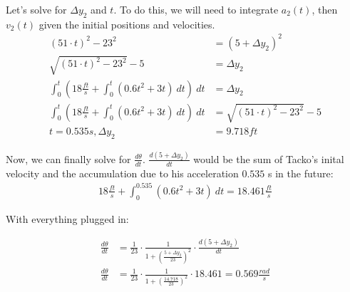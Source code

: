 \documentclass[xcolor={usenames, dvipsnames}]{beamer}
\begin{document}
\begin{frame}

    \begin{figure}[t]
    \end{figure}

    Let's solve for $\Delta y_2$ and $t$. To do this, we will need to integrate $a_2(t)$, 
    then $v_2(t)$ given the initial positions and velocities. 
    \begin{align*}
       (51 \cdot t)^2 -23^2 &=(5+\Delta y_2)^2 \\
       \sqrt{(51 \cdot t)^2 - 23^2} - 5 &= \Delta y_2\\
       \int_{0}^{t} (18\frac{ft}{s}+\int_{0}^{t} (0.6t^2+3t) \ dt) \ dt &= \Delta y_2 \\
       \int_{0}^{t} (18\frac{ft}{s}+\int_{0}^{t} (0.6t^2+3t) \ dt) \ dt &= \sqrt{(51 \cdot t)^2 - 23^2} - 5 \\
       t = 0.535 s, \Delta y_2 &= 9.718 ft
    \end{align*}

\end{frame}

\begin{frame}

    Now, we can finally solve for $\frac{d\theta}{dt}$. 
    $\frac{d(5+\Delta y_2)}{dt}$ would be the sum of Tacko's inital velocity and 
    the accumulation due to his acceleration $0.535$ s in the future:
    \begin{align*}
        18\frac{ft}{s}+\int_{0}^{0.535}(0.6t^2+3t) \ dt = 18.461 \frac{ft}{s}
    \end{align*}
    \begin{center}
        With everything plugged in:
    \end{center}
    \begin{align*}
        \frac{d\theta}{dt} &= \frac{1}{23} \cdot \frac{1}{1 + (\frac{5 + \Delta y_{2}}{23})^2} \cdot \frac{d(5 + \Delta y_{2})}{dt}\\
        \frac{d\theta}{dt} &= \frac{1}{23} \cdot \frac{1}{1 + (\frac{14.718}{23})^2} \cdot 18.461 = 0.569 \frac{rad}{s}
    \end{align*}
\end{frame}
\end{document}
